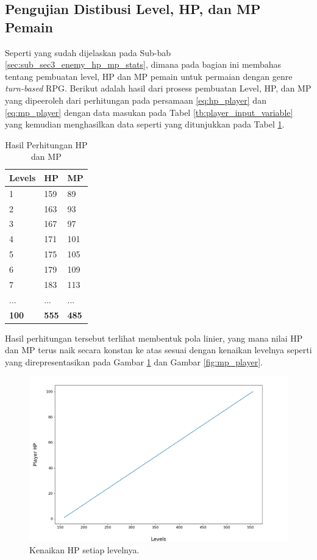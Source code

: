 \subsection{Pengujian Distibusi Level, HP, dan MP Pemain}
\label{sec:sub_sec4_eval_dist_hp_mp_level}
\vspace{1ex}

Seperti yang sudah dijelaskan pada Sub-bab \ref{sec:sub_sec3_enemy_hp_mp_stats}, dimana pada bagian ini membahas tentang pembuatan level, HP dan MP pemain untuk permaian dengan genre \textit{turn-based} RPG. Berikut adalah hasil dari prosess pembuatan Level, HP, dan MP yang dipeeroleh dari perhitungan pada persamaan \ref{eq:hp_player} dan \ref{eq:mp_player} dengan data masukan pada Tabel \ref{tb:player_input_variable} yang kemudian menghasilkan data seperti yang ditunjukkan pada Tabel \ref{tb:player_hp_mp}.

\begin{longtable}{|l|l|l|}
	\caption{Hasil Perhitungan HP dan MP}
	\label{tb:player_hp_mp}\\
	\hline
	\rowcolor[HTML]{C0C0C0} 
	\textbf{Levels} & \textbf{HP} & \textbf{MP} \\ \hline
	1 & 159 & 89 \\ \hline
	2 & 163 & 93 \\ \hline
	3 & 167 & 97 \\ \hline
	4 & 171 & 101 \\ \hline
	5 & 175 & 105 \\ \hline
	6 & 179 & 109 \\ \hline
	7 & 183 & 113 \\ \hline
	... & ... & ... \\ \hline
	\textbf{100} & \textbf{555} & \textbf{485} \\ \hline
\end{longtable}
\vspace{1ex}

Hasil perhitungan tersebut terlihat membentuk pola linier, yang mana nilai HP dan MP terus naik secara konstan ke atas sesuai dengan kenaikan levelnya seperti yang direpresentasikan pada Gambar \ref{fig:hp_player} dan Gambar \ref{fig:mp_player}.

\begin{figure} [!h] \centering
	\includegraphics[scale=0.45]{img/PlayerHpDistrib.png}
	\caption{Kenaikan HP setiap levelnya.}
	\label{fig:hp_player}
\end{figure}

